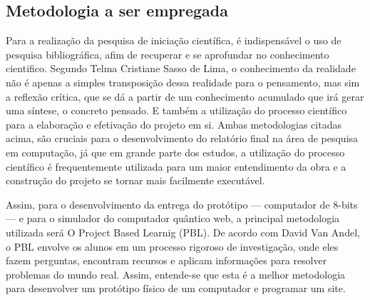 \subsection{Metodologia a ser empregada}
Para a realização da pesquisa de iniciação científica, é indispensável o uso de pesquisa bibliográfica, afim de recuperar e se aprofundar no conhecimento cientifico. Segundo Telma Cristiane Sasso de Lima, o conhecimento da realidade não é apenas a simples transposição dessa realidade para o pensamento, mas sim a reflexão crítica, que se dá a partir de um conhecimento acumulado que irá gerar uma síntese, o concreto pensado\cite{1}. E também a utilização do processo científico para a elaboração e efetivação do projeto em si. Ambas metodologias citadas acima, são cruciais para o desenvolvimento do relatório final na área de pesquisa em computação, já que em grande parte dos estudos, a utilização do processo científico é frequentemente utilizada para um maior entendimento da obra e a construção do projeto se tornar mais facilmente executável.

Assim, para o desenvolvimento da entrega do protótipo — computador de 8-bits — e para o simulador do computador quântico web, a principal metodologia utilizada será O Project Based Learnig (PBL). De acordo com David Van Andel, o PBL envolve os alunos em um processo rigoroso de investigação, onde eles fazem perguntas, encontram recursos e aplicam informações para resolver problemas do mundo real\cite{3}. Assim, entende-se que esta é a melhor metodologia para desenvolver um protótipo físico de um computador e programar um site.

\newpage

